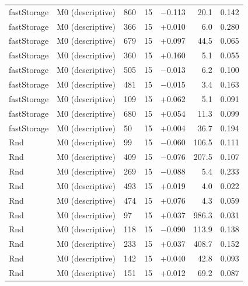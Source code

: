 \documentclass[a4paper,11pt]{article}
\begin{document}
\begin{longtable}{@{}lllrrrr@{}}
fastStorage & M0 (descriptive) & 860 & 15 & $-$0.113 & 20.1 & 0.142 \\
fastStorage & M0 (descriptive) & 366 & 15 & +0.010 & 6.0 & 0.280 \\
fastStorage & M0 (descriptive) & 679 & 15 & +0.097 & 44.5 & 0.065 \\
fastStorage & M0 (descriptive) & 360 & 15 & +0.160 & 5.1 & 0.055 \\
fastStorage & M0 (descriptive) & 505 & 15 & $-$0.013 & 6.2 & 0.100 \\
fastStorage & M0 (descriptive) & 481 & 15 & $-$0.015 & 3.4 & 0.163 \\
fastStorage & M0 (descriptive) & 109 & 15 & +0.062 & 5.1 & 0.091 \\
fastStorage & M0 (descriptive) & 680 & 15 & +0.054 & 11.3 & 0.099 \\
fastStorage & M0 (descriptive) & 50 & 15 & +0.004 & 36.7 & 0.194 \\
Rnd & M0 (descriptive) & 99 & 15 & $-$0.060 & 106.5 & 0.111 \\
Rnd & M0 (descriptive) & 409 & 15 & $-$0.076 & 207.5 & 0.107 \\
Rnd & M0 (descriptive) & 269 & 15 & $-$0.088 & 5.4 & 0.233 \\
Rnd & M0 (descriptive) & 493 & 15 & +0.019 & 4.0 & 0.022 \\
Rnd & M0 (descriptive) & 474 & 15 & +0.076 & 4.3 & 0.059 \\
Rnd & M0 (descriptive) & 97 & 15 & +0.037 & 986.3 & 0.031 \\
Rnd & M0 (descriptive) & 118 & 15 & $-$0.090 & 113.9 & 0.138 \\
Rnd & M0 (descriptive) & 233 & 15 & +0.037 & 408.7 & 0.152 \\
Rnd & M0 (descriptive) & 142 & 15 & +0.040 & 42.8 & 0.093 \\
Rnd & M0 (descriptive) & 151 & 15 & +0.012 & 69.2 & 0.087 \\
\end{longtable}
\normalsize\setlength{\tabcolsep}{4pt}
\end{document}
